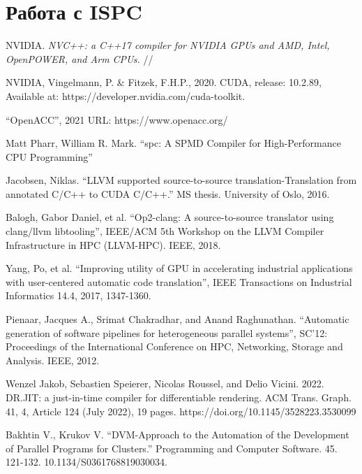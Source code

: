 \documentclass[11pt,fleqn,english,russian]{report} %
\begin{document}
\chapter{Работа с ISPC}


\begin{thebibliography}{10}
	
	 NVIDIA. \textit{NVC++: a C++17 compiler for NVIDIA GPUs and AMD, Intel, OpenPOWER, and Arm CPUs.} // 	
	
	 NVIDIA, Vingelmann, P. \& Fitzek, F.H.P., 2020. CUDA, release: 10.2.89, Available at: https://developer.nvidia.com/cuda-toolkit.	
	
	 ``OpenACC'', 2021 URL: https://www.openacc.org/
	
	 Matt Pharr, William R. Mark. ``spc: A SPMD Compiler for High-Performance CPU Programming''
	
	 Jacobsen, Niklas. ``LLVM supported source-to-source translation-Translation from annotated C/C++ to CUDA C/C++.'' MS thesis. University of Oslo, 2016. 
	
	 Balogh, Gabor Daniel, et al. ``Op2-clang: A source-to-source translator using clang/llvm libtooling'', IEEE/ACM 5th Workshop on the LLVM Compiler Infrastructure in HPC (LLVM-HPC). IEEE, 2018. 
	
	 Yang, Po, et al. ``Improving utility of GPU in accelerating industrial applications with user-centered automatic code translation'', IEEE Transactions on Industrial Informatics 14.4, 2017, 1347-1360. 
	
	 Pienaar, Jacques A., Srimat Chakradhar, and Anand Raghunathan. ``Automatic generation of software pipelines for heterogeneous parallel systems'', SC'12: Proceedings of the International Conference on HPC, Networking, Storage and Analysis. IEEE, 2012. 	
	
	 Wenzel Jakob, Sebastien Speierer, Nicolas Roussel, and Delio Vicini. 2022. DR.JIT: a just-in-time compiler for differentiable rendering. ACM Trans. Graph. 41, 4, Article 124 (July 2022), 19 pages. https://doi.org/10.1145/3528223.3530099
	
	 Bakhtin V., Krukov V. ``DVM-Approach to the Automation of the Development of Parallel Programs for Clusters.'' Programming and Computer Software. 45. 121-132. 10.1134/S0361768819030034. 
	

\end{thebibliography}
\end{document}

